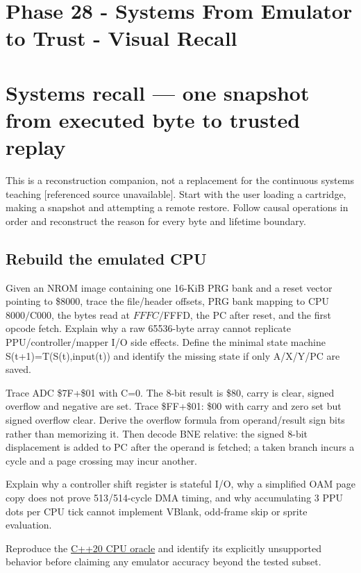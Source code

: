 \hypertarget{appendix-11f73b337e37}{}
\section*{Phase 28 - Systems From Emulator to Trust - Visual Recall}
\section{Systems recall --- one snapshot from executed byte to trusted replay}\label{appendix-11f73b337e37-systems-recall-one-snapshot-from-executed-byte-to-trusted-replay}

This is a reconstruction companion, not a replacement for {the continuous systems teaching {[}referenced source unavailable{]}}. Start with the user loading a cartridge, making a snapshot and attempting a remote restore. Follow causal operations in order and reconstruct the reason for every byte and lifetime boundary.

\subsection{Rebuild the emulated CPU}\label{appendix-11f73b337e37-rebuild-the-emulated-cpu}

Given an NROM image containing one 16-KiB PRG bank and a reset vector pointing to \$8000, trace the file/header offsets, PRG bank mapping to CPU \(8000/\)C000, the bytes read at \(FFFC/\)FFFD, the PC after reset, and the first opcode fetch. Explain why a raw 65536-byte array cannot replicate PPU/controller/mapper I/O side effects. Define the minimal state machine S(t+1)=T(S(t),input(t)) and identify the missing state if only A/X/Y/PC are saved.

Trace ADC \$7F+\$01 with C=0. The 8-bit result is \$80, carry is clear, signed overflow and negative are set. Trace \$FF+\$01: \$00 with carry and zero set but signed overflow clear. Derive the overflow formula from operand/result sign bits rather than memorizing it. Then decode BNE relative: the signed 8-bit displacement is added to PC after the operand is fetched; a taken branch incurs a cycle and a page crossing may incur another.

Explain why a controller shift register is stateful I/O, why a simplified OAM page copy does not prove 513/514-cycle DMA timing, and why accumulating 3 PPU dots per CPU tick cannot implement VBlank, odd-frame skip or sprite evaluation.

Reproduce the \hyperref[source-file-552a9e2296dc984412c8f06d]{C++20 CPU oracle} and identify its explicitly unsupported behavior before claiming any emulator accuracy beyond the tested subset.


